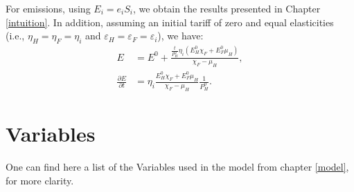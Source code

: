 For emissions, using $E_i = e_i S_i$, we obtain the results presented in Chapter \ref{intuition}. In addition, assuming an initial tariff of zero and equal elasticities (i.e., $\eta_H = \eta_F = \eta_i$ and $\varepsilon_H = \varepsilon_F = \varepsilon_i$), we have:
\begin{align*}
    E                             & = E^0 + \frac{\frac{t}{P_H^0} \eta_i (E_H^0 \chi_F + E_F^0 \mu_H)}{\chi_F - \mu_H}, \\[1mm]
    \frac{\partial E}{\partial t} & = \eta_i \frac{E_H^0 \chi_F + E_F^0 \mu_H}{\chi_F - \mu_H}\frac{1}{P_H^0}.
\end{align*}

\section{Variables}\label{appendix:variables}

One can find here a list of the Variables used in the model from chapter \ref{model}, for more clarity.

